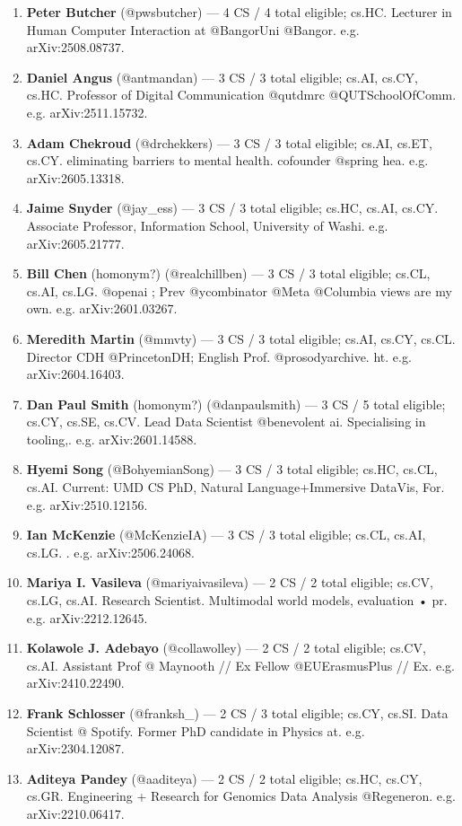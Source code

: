 \documentclass[twocolumn,10pt,letterpaper]{article}
\begin{document}
\begin{enumerate}
  \item \textbf{Peter Butcher} (@pwsbutcher) — 4 CS / 4 total eligible; cs.HC. Lecturer in Human Computer Interaction at @BangorUni @Bangor. e.g. arXiv:2508.08737.
  \item \textbf{Daniel Angus} (@antmandan) — 3 CS / 3 total eligible; cs.AI, cs.CY, cs.HC. Professor of Digital Communication @qutdmrc @QUTSchoolOfComm. e.g. arXiv:2511.15732.
  \item \textbf{Adam Chekroud} (@drchekkers) — 3 CS / 3 total eligible; cs.AI, cs.ET, cs.CY. eliminating barriers to mental health. cofounder @spring hea. e.g. arXiv:2605.13318.
  \item \textbf{Jaime Snyder} (@jay\_ess) — 3 CS / 3 total eligible; cs.HC, cs.AI, cs.CY. Associate Professor, Information School, University of Washi. e.g. arXiv:2605.21777.
  \item \textbf{Bill Chen} (homonym?) (@realchillben) — 3 CS / 3 total eligible; cs.CL, cs.AI, cs.LG. @openai ; Prev @ycombinator @Meta @Columbia views are my own. e.g. arXiv:2601.03267.
  \item \textbf{Meredith Martin} (@mmvty) — 3 CS / 3 total eligible; cs.AI, cs.CY, cs.CL. Director CDH @PrincetonDH; English Prof. @prosodyarchive. ht. e.g. arXiv:2604.16403.
  \item \textbf{Dan Paul Smith} (homonym?) (@danpaulsmith) — 3 CS / 5 total eligible; cs.CY, cs.SE, cs.CV. Lead Data Scientist @benevolent ai. Specialising in tooling,. e.g. arXiv:2601.14588.
  \item \textbf{Hyemi Song} (@BohyemianSong) — 3 CS / 3 total eligible; cs.HC, cs.CL, cs.AI. Current: UMD CS PhD, Natural Language+Immersive DataVis, For. e.g. arXiv:2510.12156.
  \item \textbf{Ian McKenzie} (@McKenzieIA) — 3 CS / 3 total eligible; cs.CL, cs.AI, cs.LG. . e.g. arXiv:2506.24068.
  \item \textbf{Mariya I. Vasileva} (@mariyaivasileva) — 2 CS / 2 total eligible; cs.CV, cs.LG, cs.AI. Research Scientist. Multimodal world models, evaluation • pr. e.g. arXiv:2212.12645.
  \item \textbf{Kolawole J. Adebayo} (@collawolley) — 2 CS / 2 total eligible; cs.CV, cs.AI. Assistant Prof @ Maynooth // Ex Fellow @EUErasmusPlus // Ex. e.g. arXiv:2410.22490.
  \item \textbf{Frank Schlosser} (@franksh\_) — 2 CS / 3 total eligible; cs.CY, cs.SI. Data Scientist @ Spotify. Former PhD candidate in Physics at. e.g. arXiv:2304.12087.
  \item \textbf{Aditeya Pandey} (@aaditeya) — 2 CS / 2 total eligible; cs.HC, cs.CY, cs.GR. Engineering + Research for Genomics Data Analysis @Regeneron. e.g. arXiv:2210.06417.

\end{enumerate}
\end{document}

